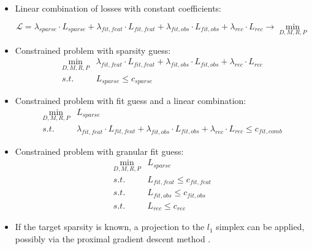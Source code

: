 \documentclass[a4paper,11pt,oneside]{report}
\begin{document}
\begin{itemize}
    \item Linear combination of losses with constant coefficients:

    \begin{equation}
    \label{eq:opt_scheme_linear_comb}
    \mathcal L=\lambda_{sparse}\cdot L_{sparse}+\lambda_{fit,feat}\cdot L_{fit, feat}+\lambda_{fit,obs}\cdot L_{fit, obs}+\lambda_{rec}\cdot L_{rec}\to\min\limits_{D,M,R,P}
    \end{equation}

    \item Constrained problem with sparsity guess:
    \begin{equation}
    \label{eq:opt_scheme_sparsity_guess}
    \begin{array}{ll}
    \min\limits_{D,M,R,P}& \lambda_{fit,feat}\cdot L_{fit, feat}+\lambda_{fit,obs}\cdot L_{fit, obs}+\lambda_{rec}\cdot L_{rec}\\
    s.t.& L_{sparse}\leq c_{sparse}
    \end{array}
    \end{equation}

    \item Constrained problem with fit guess and a linear combination:
    \begin{equation}
    \label{eq:opt_scheme_fit_guess_lin_comb}
    \begin{array}{ll}
    \min\limits_{D,M,R,P}& L_{sparse}\\
    s.t.&\lambda_{fit,feat}\cdot L_{fit, feat}+\lambda_{fit,obs}\cdot L_{fit, obs}+\lambda_{rec}\cdot L_{rec} \leq c_{fit, comb}
    \end{array}
    \end{equation}

    \item Constrained problem with granular fit guess:
    \begin{equation}
    \label{eq:opt_scheme_fit_guess_granular}
    \begin{array}{ll}
    \min\limits_{D,M,R,P}& L_{sparse}\\
    s.t.&L_{fit, feat}\leq c_{fit, feat}\\
    s.t.&L_{fit, obs}\leq c_{fit, obs}\\
    s.t.&L_{rec}\leq c_{rec}
    \end{array}
    \end{equation}

    \item If the target sparsity is known, a projection \cite{DasGupta} to the $l_1$ simplex can be applied, possibly via the proximal gradient descent method \cite{Deleu2015}.


\end{itemize}
\end{document}
